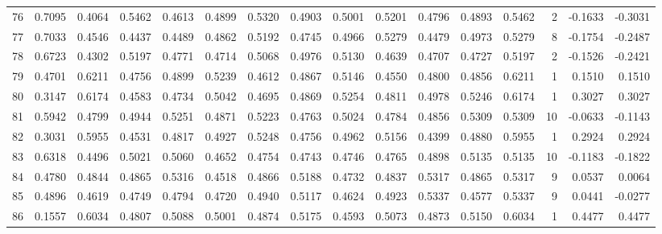 \begin{tabular}{lrrrrrrrrrrrrrrr}
76  &      0.7095 &  0.4064 &  0.5462 &  0.4613 &  0.4899 &  0.5320 &  0.4903 &  0.5001 &  0.5201 &  0.4796 &   0.4893 &     0.5462 &      2 &                   -0.1633 &                    -0.3031 \\
77  &      0.7033 &  0.4546 &  0.4437 &  0.4489 &  0.4862 &  0.5192 &  0.4745 &  0.4966 &  0.5279 &  0.4479 &   0.4973 &     0.5279 &      8 &                   -0.1754 &                    -0.2487 \\
78  &      0.6723 &  0.4302 &  0.5197 &  0.4771 &  0.4714 &  0.5068 &  0.4976 &  0.5130 &  0.4639 &  0.4707 &   0.4727 &     0.5197 &      2 &                   -0.1526 &                    -0.2421 \\
79  &      0.4701 &  0.6211 &  0.4756 &  0.4899 &  0.5239 &  0.4612 &  0.4867 &  0.5146 &  0.4550 &  0.4800 &   0.4856 &     0.6211 &      1 &                    0.1510 &                     0.1510 \\
80  &      0.3147 &  0.6174 &  0.4583 &  0.4734 &  0.5042 &  0.4695 &  0.4869 &  0.5254 &  0.4811 &  0.4978 &   0.5246 &     0.6174 &      1 &                    0.3027 &                     0.3027 \\
81  &      0.5942 &  0.4799 &  0.4944 &  0.5251 &  0.4871 &  0.5223 &  0.4763 &  0.5024 &  0.4784 &  0.4856 &   0.5309 &     0.5309 &     10 &                   -0.0633 &                    -0.1143 \\
82  &      0.3031 &  0.5955 &  0.4531 &  0.4817 &  0.4927 &  0.5248 &  0.4756 &  0.4962 &  0.5156 &  0.4399 &   0.4880 &     0.5955 &      1 &                    0.2924 &                     0.2924 \\
83  &      0.6318 &  0.4496 &  0.5021 &  0.5060 &  0.4652 &  0.4754 &  0.4743 &  0.4746 &  0.4765 &  0.4898 &   0.5135 &     0.5135 &     10 &                   -0.1183 &                    -0.1822 \\
84  &      0.4780 &  0.4844 &  0.4865 &  0.5316 &  0.4518 &  0.4866 &  0.5188 &  0.4732 &  0.4837 &  0.5317 &   0.4865 &     0.5317 &      9 &                    0.0537 &                     0.0064 \\
85  &      0.4896 &  0.4619 &  0.4749 &  0.4794 &  0.4720 &  0.4940 &  0.5117 &  0.4624 &  0.4923 &  0.5337 &   0.4577 &     0.5337 &      9 &                    0.0441 &                    -0.0277 \\
86  &      0.1557 &  0.6034 &  0.4807 &  0.5088 &  0.5001 &  0.4874 &  0.5175 &  0.4593 &  0.5073 &  0.4873 &   0.5150 &     0.6034 &      1 &                    0.4477 &                     0.4477 \\

\end{tabular}
